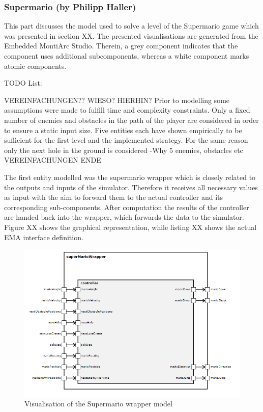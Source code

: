 \newpage
\subsubsection{Supermario (by Philipp Haller)}

This part discusses the model used to solve a level of the Supermario game which was presented in section XX. The presented visualisations are generated from the Embedded MontiArc Studio. Therein, a grey component indicates that the component uses additional subcomponents, whereas a white component marks atomic components. 

TODO List:


VEREINFACHUNGEN?? WIESO? HIERHIN?
Prior to modelling some assumptions were made to fulfill time and complexity constraints.
Only a fixed number of enemies and obstacles in the path of the player are considered in order to ensure a static input size. Five entities each have shown empirically to be sufficient for the first level and the implemented strategy. For the same reason only the next hole in the ground is considered
-Why 5 enemies, obstacles etc
VEREINFACHUNGEN ENDE

The first entity modelled was the supermario wrapper which is closely related to the outputs and inputs of the simulator. Therefore it receives all necessary values as input with the aim to forward them to the actual controller and its corresponding sub-components. After computation the results of the controller are handed back into the wrapper, which forwards the data to the simulator. Figure XX shows the graphical representation, while listing XX shows the actual EMA interface definition.
\begin{figure}
	\centering
	\includegraphics[scale=0.5]{pictures/haller_supermariowrapper.PNG}
	\caption{Visualisation of the Supermario wrapper model}
	\label{fig:marioWrapper}
\end{figure}


